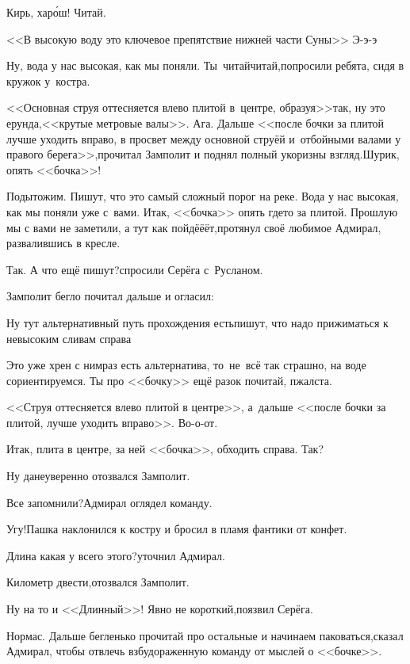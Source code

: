 \diagdash Кирь, хар\'ош! Читай.

\diagdash <<\myldots{}В высокую воду это ключевое препятствие нижней части Суны>>\myldots{} Э-э-э\myldots{}

\diagdash Ну, вода у нас высокая, как мы поняли. Ты~читай\sdash читай,\mdash попросили ребята, сидя в кружок у~костра.

\diagdash <<Основная струя оттесняется влево плитой в~центре, образуя\myldots{}>>\mdash так, ну это ерунда,\mdash <<\myldots{}крутые метровые валы>>. Ага. Дальше <<\myldots{}после бочки за плитой лучше уходить вправо, в просвет между основной струёй и~отбойными валами у правого берега>>,\mdash прочитал Замполит и поднял полный укоризны взгляд.\mdash Шурик, опять <<бочка>>!

\diagdash Подытожим. Пишут, что это самый сложный порог на реке. Вода у нас высокая, как мы поняли уже с~вами. Итак, <<бочка>> опять где\sdash то за плитой. Прошлую мы с вами не заметили, а тут как пойдё\sdash ё\sdash ёт,\mdash протянул своё любимое Адмирал, развалившись в кресле.

\diagdash Так. А что ещё пишут?\mdash спросили Серёга с~Русланом.

Замполит бегло почитал дальше и огласил:

\diagdash Ну тут альтернативный путь прохождения есть\mdash пишут, что надо прижиматься к невысоким сливам справа\myldots{}

\diagdash Это уже хрен с ним\mdash раз есть альтернатива, то~не~всё так страшно, на воде сориентируемся. Ты про <<бочку>> ещё разок почитай, п\sdash жалста.

\diagdash <<\myldots{}Струя оттесняется влево плитой в центре>>, а~дальше <<после бочки за плитой, лучше уходить вправо>>. Во-о-от.

\diagdash Итак, плита в центре, за ней <<бочка>>, обходить справа. Так?

\diagdash Ну да\myldots{}\mdash неуверенно отозвался Замполит.

\diagdash Все запомнили?\mdash Адмирал оглядел команду.

\diagdash Угу!\mdash Пашка наклонился к костру и бросил в пламя фантики от конфет.

\diagdash Длина какая у всего этого?\mdash уточнил Адмирал.

\diagdash Километр двести,\mdash отозвался Замполит.

\diagdash Ну на то и <<Длинный>>! Явно не короткий,\mdash поязвил Серёга.

\diagdash Нормас. Дальше бегленько прочитай про остальные и начинаем паковаться,\mdash сказал Адмирал, чтобы отвлечь взбудораженную команду от мыслей о <<бочке>>.

